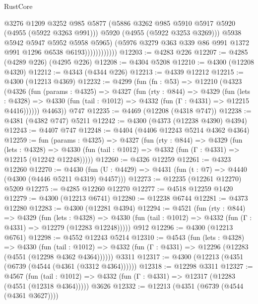 \begin{lexlean}{RustCore}
\begin{coremodule}
                              @3276
                              @1209
                              @3252
                              @985
                              @5877
                              (@5886 @3262 @985 @5910 @5917 @5920 (@4955 (@5922 @3263 @991)))
                              @5920
                              (@4955 (@5922 @3253 @3269)))
                            @5938
                            @5942
                            @5947
                            @5952
                            @5958
                            @5965)
                          (@5976 @3279 @363 @339 @86 @991 @1372 @991 @1296 @6538 @6193))))))))))))
@12203 := @4283 @226
@12207 := @4285 (@4289 @226) (@4295 @226)
@12208 := @4304 @5208
@12210 := @4300 (@12208 @4320)
@12212 := @4343 (@4344 @226)
@12213 := @4339 @12212
@12215 := @4300 (@12213 @4369)
@12232 := @4299
    (fun (fn : @53) =>
    @12210
      (@4323
        (@4326
          (fun (params : @4325) =>
          @4327
            (fun (rty : @844) =>
            @4329
              (fun (lets : @4328) =>
              @4330 (fun (tail : @1012) => @4332 (fun (Γ : @4331) => @12215 @4416))))))
        @4463))
    @747
@12235 := @4469 (@12208 (@4318 @747))
@12238 := @4381 (@4382 @747) @5211
@12242 := @4300 (@4373 (@12238 @4390) @4394)
@12243 := @4407 @747
@12248 := @4404 (@4406 @12243 @5214 @4362 @4364)
@12259 := fun (params : @4325) =>
  @4327
    (fun (rty : @844) =>
    @4329
      (fun (lets : @4328) =>
      @4330 (fun (tail : @1012) => @4332 (fun (Γ : @4331) => @12215 (@12242 @12248)))))
@12260 := @4326 @12259
@12261 := @4323 @12260
@12270 := @4430 (fun (U : @4429) => @4431 (fun (t : @7) => @4440 (@4300 (@4446 @5211 @4319) @4457)))
@12273 := @12235 (@12261 @12270) @5209
@12275 := @4285 @12260 @12270
@12277 := @4518 @12259 @1420
@12279 := @4300 (@12213 @6741)
@12280 := @12238 @6744
@12281 := @4373 @12280
@12283 := @4300 (@12281 @4394)
@12294 := @4521
    (fun (rty : @844) =>
    @4329
      (fun (lets : @4328) =>
      @4330 (fun (tail : @1012) => @4332 (fun (Γ : @4331) => @12279 (@12283 @12248)))))
    @912
@12296 := @4300 (@12213 @6761)
@12298 := @4552 @12243 @5214
@12310 := @4543
    (fun (lets : @4328) =>
    @4330
      (fun (tail : @1012) =>
      @4332 (fun (Γ : @4331) => @12296 (@12283 (@4551 (@12298 @4362 @4364))))))
    @3311
@12317 := @4300 (@12213 (@4351 (@6739 (@4544 (@4361 (@3312 @4364))))))
@12318 := @12298 @3311
@12327 := @4567
    (fun (tail : @1012) => @4332 (fun (Γ : @4331) => @12317 (@12283 (@4551 (@12318 @4364)))))
    @3626
@12332 := @12213 (@4351 (@6739 (@4544 (@4361 @3627))))

\end{coremodule}
\end{lexlean}
